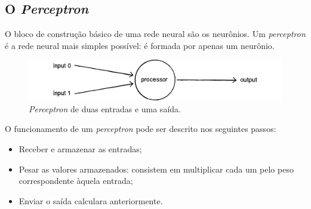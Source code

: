 %

\subsection{O \textit{Perceptron}}

O bloco de construção básico de uma rede neural são os neurônios. Um \textit{perceptron} é a rede
neural mais simples possível: é formada por apenas um neurônio.

\begin{figure}[H]
\centering
\includegraphics[width=15cm]{figuras/rede_neural_perceptron}
\caption{\textit{Perceptron} de duas entradas e uma saída.}\label{fig:rede_neural_perceptron}
\end{figure}


O funcionamento de um \textit{perceptron} pode ser descrito nos seguintes passos:

\begin{itemize}
\item
  Receber e armazenar as entradas;
\item
  Pesar as valores armazenados: consistem em multiplicar cada um pelo peso correspondente àquela entrada;
\item
  Enviar o saída calculara anteriormente.
\end{itemize}

